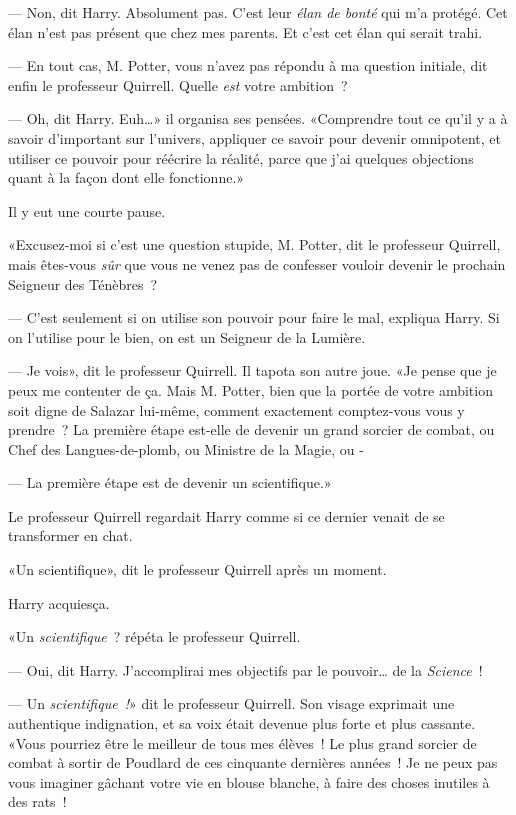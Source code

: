 --- Non, dit Harry. Absolument pas. C'est leur \emph{élan de bonté} qui m'a protégé. Cet élan n'est pas présent que chez mes parents. Et c'est cet élan qui serait trahi.

--- En tout cas, M. Potter, vous n'avez pas répondu à ma question initiale, dit enfin le professeur Quirrell. Quelle \emph{est} votre ambition~?

--- Oh, dit Harry. Euh…» il organisa ses pensées. «Comprendre tout ce qu'il y a à savoir d'important sur l'univers, appliquer ce savoir pour devenir omnipotent, et utiliser ce pouvoir pour réécrire la réalité, parce que j'ai quelques objections quant à la façon dont elle fonctionne.»

Il y eut une courte pause.

«Excusez-moi si c'est une question stupide, M. Potter, dit le professeur Quirrell, mais êtes-vous \emph{sûr} que vous ne venez pas de confesser vouloir devenir le prochain Seigneur des Ténèbres~?

--- C'est seulement si on utilise son pouvoir pour faire le mal, expliqua Harry. Si on l'utilise pour le bien, on est un Seigneur de la Lumière.

--- Je vois», dit le professeur Quirrell. Il tapota son autre joue. «Je pense que je peux me contenter de ça. Mais M. Potter, bien que la portée de votre ambition soit digne de Salazar lui-même, comment exactement comptez-vous vous y prendre~? La première étape est-elle de devenir un grand sorcier de combat, ou Chef des Langues-de-plomb, ou Ministre de la Magie, ou -

--- La première étape est de devenir un scientifique.»

Le professeur Quirrell regardait Harry comme si ce dernier venait de se transformer en chat.

«Un scientifique», dit le professeur Quirrell après un moment.

Harry acquiesça.

«Un \emph{scientifique}~? répéta le professeur Quirrell.

--- Oui, dit Harry. J'accomplirai mes objectifs par le pouvoir… de la \emph{Science}~!

--- Un \emph{scientifique~!}» dit le professeur Quirrell. Son visage exprimait une authentique indignation, et sa voix était devenue plus forte et plus cassante. «Vous pourriez être le meilleur de tous mes élèves~! Le plus grand sorcier de combat à sortir de Poudlard de ces cinquante dernières années~! Je ne peux pas vous imaginer gâchant votre vie en blouse blanche, à faire des choses inutiles à des rats~!

